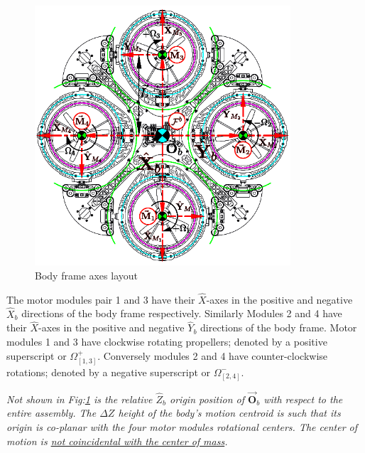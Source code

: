 \begin{figure}[htbp]
\vspace{-6pt}
\centering
\includegraphics[width=0.85\textwidth]{figs/body-frame}
\vspace{-4pt}
\caption{Body frame axes layout}
\label{fig:body-frame}
\vspace{-16pt}
\end{figure}
\par
The motor modules pair 1 and 3 have their $\hat{X}$-axes in the positive and negative $\hat{X}_b$ directions of the body frame respectively. Similarly Modules 2 and 4 have their $\hat{X}$-axes in the positive and negative $\hat{Y}_b$ directions of the body frame. Motor modules 1 and 3 have clockwise rotating propellers; denoted by a positive superscript or $\Omega_{[1,3]}^{+}$. Conversely modules 2 and 4 have counter-clockwise rotations; denoted by a negative superscript or $\Omega_{[2,4]}^{-}$.
\par
\emph{\color{Gray}Not shown in Fig:\ref{fig:body-frame} is the relative $\hat{Z}_b$ origin position of $\vec{\mathbf{O}}_b$ with respect to the entire assembly. The $\Delta Z$ height of the body's motion centroid is such that its origin is co-planar with the four motor modules rotational centers. The center of motion is \underline{not coincidental with the center of mass}.}
\par
